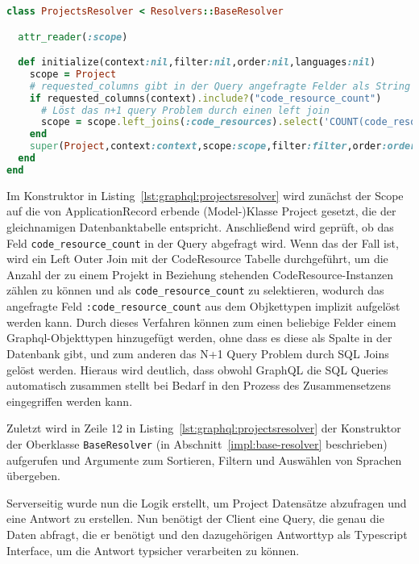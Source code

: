 \begin{lstlisting}[language=Ruby,float=h!,caption={Klasse zum Auflösung der Query \lstinline|:projects|. \lstinline|/graphql/resolvers/projects_resolver.rb|}, label={lst:graphql:projectsresolver}]
class ProjectsResolver < Resolvers::BaseResolver

  attr_reader(:scope)

  def initialize(context:nil,filter:nil,order:nil,languages:nil)
    scope = Project
    # requested_columns gibt in der Query angefragte Felder als String Array zurück
    if requested_columns(context).include?("code_resource_count")
      # Löst das n+1 query Problem durch einen left join
      scope = scope.left_joins(:code_resources).select('COUNT(code_resources) AS code_resource_count').group('projects.id')
    end
    super(Project,context:context,scope:scope,filter:filter,order:order,languages:languages,order_dir: "asc",order_field:"name")
  end
end
\end{lstlisting}

Im Konstruktor in Listing~\ref{lst:graphql:projectsresolver} wird zunächst der Scope auf die von ApplicationRecord erbende (Model-)Klasse Project gesetzt, die der gleichnamigen Datenbanktabelle entspricht. Anschließend wird geprüft, ob das Feld \texttt{code\_resource\_count} in der Query abgefragt wird. Wenn das der Fall ist, wird ein Left Outer Join mit der CodeResource Tabelle durchgeführt, um die Anzahl der zu einem Projekt in Beziehung stehenden CodeResource-Instanzen zählen zu können und als \texttt{code\_resource\_count} zu selektieren, wodurch das angefragte Feld \texttt{:code\_resource\_count} aus dem Objkettypen  implizit aufgelöst werden kann. Durch dieses Verfahren können zum einen beliebige Felder einem Graphql-Objekttypen hinzugefügt werden, ohne dass es diese als Spalte in der Datenbank gibt, und zum anderen das N+1 Query Problem durch SQL Joins gelöst werden. 
Hieraus wird deutlich, dass obwohl GraphQL die SQL Queries automatisch zusammen stellt bei Bedarf in den Prozess des Zusammensetzens eingegriffen werden kann.

Zuletzt wird in Zeile 12 in Listing~\ref{lst:graphql:projectsresolver} der Konstruktor der Oberklasse \texttt{BaseResolver} (in Abschnitt~\ref{impl:base-resolver} beschrieben) aufgerufen und  Argumente zum Sortieren, Filtern und Auswählen von Sprachen übergeben.

Serverseitig wurde nun die Logik erstellt, um Project Datensätze abzufragen und eine Antwort zu erstellen.
Nun benötigt der Client eine Query, die genau die Daten abfragt, die er benötigt und den dazugehörigen Antworttyp als Typescript Interface, um die Antwort typsicher verarbeiten zu können.

